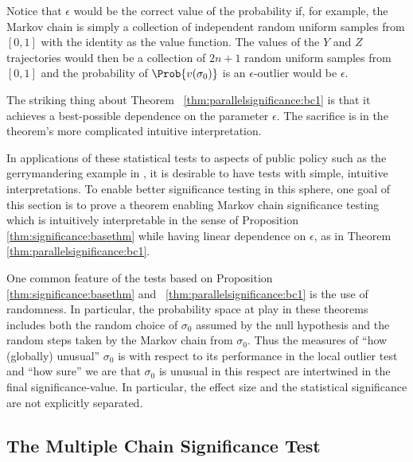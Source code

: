\documentclass[12pt]{article}
\begin{document}
\begin{remark}
    Notice that \( \epsilon \) would be the correct value of the
    probability if, for example, the Markov chain is simply a collection
    of independent random uniform samples from \( [0,1] \) with the
    identity as the value function.  The values of the \( Y \) and \( Z \)
    trajectories would then be a collection of \( 2n + 1 \) random
    uniform samples from \( [0,1] \) and the probability of \( \Prob{v(\sigma_0)}
    \) is an \( \epsilon \)-outlier would be \( \epsilon \).

    The striking thing about Theorem~%
    \ref{thm:parallelsignificance:bc1} is that it achieves a
    best-possible dependence on the parameter \( \epsilon \).  The
    sacrifice is in the theorem's more complicated intuitive
    interpretation.

    In applications of these statistical tests to aspects of public
    policy such as the gerrymandering example in
    \cite{doi:10.1080/2330443X.2020.1806763}, it is desirable to have
    tests with simple, intuitive interpretations.  To enable better
    significance testing in this sphere, one goal of this section is to
    prove a theorem enabling Markov chain significance testing which is
    intuitively interpretable in the sense of Proposition~%
    \ref{thm:significance:basethm} while having linear dependence on \(
    \epsilon \), as in Theorem~%
    \ref{thm:parallelsignificance:bc1}.
\end{remark}

\begin{remark}
    One common feature of the tests based on Proposition~%
    \ref{thm:significance:basethm} and~%
    \ref{thm:parallelsignificance:bc1} is the use of randomness.  In
    particular, the probability space at play in these theorems includes
    both the random choice of \( \sigma_0 \) assumed by the null
    hypothesis and the random steps taken by the Markov chain from \(
    \sigma_0 \). Thus the measures of ``how (globally) unusual'' \(
    \sigma_0 \) is with respect to its performance in the local outlier
    test and ``how sure'' we are that \( \sigma_0 \) is unusual in this
    respect are intertwined in the final significance-value.  In
    particular, the effect size and the statistical significance are not
    explicitly separated.
\end{remark}

\subsection*{The Multiple Chain Significance Test}
\end{document}
